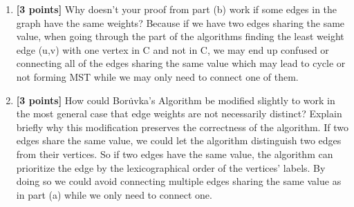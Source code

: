 \documentclass[11pt]{article}
\begin{document}
\begin{enumerate}
\begin{enumerate}
\item \textbf{[3 points]} Why doesn't your proof from part (b) work if some edges in the graph have the same weights?
Because if we have two edges sharing the same value, when going through the part of the algorithms finding the least weight edge (u,v) with one vertex in C and not in C, we may end up confused or connecting all of the edges sharing the same value which may lead to cycle or not forming MST while we may only need to connect one of them. 


\item \textbf{[3 points]} How could Bor\.{u}vka's Algorithm be modified slightly to work in the most general case
that edge weights are not necessarily distinct?  Explain briefly why this modification preserves the correctness of the algorithm.
If two edges share the same value, we could let the algorithm distinguish two edges from their vertices. So if  two edges have the same value, the algorithm can prioritize the edge by the lexicographical order of the vertices' labels. By doing so we could avoid connecting multiple edges sharing the same value as in part (a) while we only need to connect one. 

\end{enumerate}
\end{enumerate}
\end{document}
